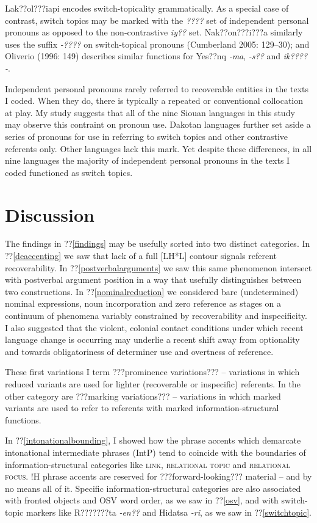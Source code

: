 \documentclass[output=paper]{LSP/langsci}
\begin{document}
	Lak??ol???iapi encodes switch-topicality grammatically. As a special case of contrast, switch topics may be marked with the \emph{????} set of independent personal pronouns as opposed to the non-contrastive \emph{iy??} set. Nak??on???i???a similarly uses the suffix \emph{-????} on switch-topical pronouns (Cumberland 2005: 129--30); and Oliverio (1996: 149) describes similar functions for Yes??nq \emph{-ma}, \emph{-s??} and \emph{ik????-}. 
	
	Independent personal pronouns rarely referred to recoverable entities in the texts I coded. When they do, there is typically a repeated or conventional collocation at play. My study suggests that all of the nine Siouan languages in this study may observe this contraint on pronoun use. Dakotan languages further set aside a series of pronouns for use in referring to switch topics and other contrastive referents only. Other languages lack this mark. Yet despite these differences, in all nine languages the majority of independent personal pronouns in the texts I coded functioned as switch topics.

\section{Discussion}\label{discussion}

The findings in ??\ref{findings} may be usefully sorted into two distinct categories. In ??\ref{deaccenting} we saw that lack of a full [LH*L] contour signals referent recoverability. In ??\ref{postverbalarguments} we saw this same phenomenon intersect with postverbal argument position in a way that usefully distinguishes between two constructions. In ??\ref{nominalreduction} we considered bare (undetermined) nominal expressions, noun incorporation and zero reference as stages on a continuum of phenomena variably constrained by recoverability and inspecificity. I also suggested that the violent, colonial contact conditions under which recent language change is occurring may underlie a recent shift away from optionality and towards obligatoriness of determiner use and overtness of reference. 

These first variations I term ???prominence variations??? -- variations in which reduced variants are used for lighter (recoverable or inspecific) referents. In the other category are ???marking variations??? -- variations in which marked variants are used to refer to referents with marked information-structural functions. 

In ??\ref{intonationalbounding}, I showed how the phrase accents which demarcate intonational intermediate phrases (IntP) tend to coincide with the boundaries of information-structural categories like \textsc{link, relational topic} and \textsc{relational focus}. !H phrase accents are reserved for ???forward-looking??? material -- and by no means all of it. Specific information-structural categories are also associated with fronted objects and OSV word order, as we saw in ??\ref{osv}, and with switch-topic markers like R???????ta \emph{-en??} and Hidatsa \emph{-ri}, as we saw in ??\ref{switchtopic}.
\end{document}

